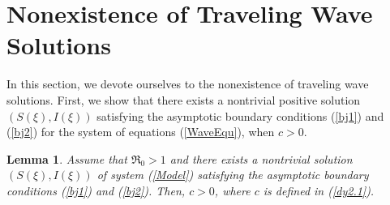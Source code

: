 \documentclass[final,3p,times]{elsarticle}
\newtheorem{lemma}{Lemma}[section]
\numberwithin{equation}{section}
\begin{document}
\section{Nonexistence of Traveling Wave Solutions}
In this section, we devote ourselves to the nonexistence of traveling wave solutions. First, we show that there exists a nontrivial positive solution \((S(\xi), I(\xi))\) satisfying the asymptotic boundary conditions  (\ref{bj1}) and  (\ref{bj2})  for the system of equations (\ref{WaveEqu}), when \(c > 0\).
\begin{lemma}\label{lemma5.1}
Assume that \(\Re_0>1\) and there exists a nontrivial solution \((S(\xi), I(\xi))\) of system (\ref{Model}) satisfying the asymptotic boundary conditions (\ref{bj1}) and  (\ref{bj2}). Then, \(c > 0\), where \(c\) is defined in (\ref{dy2.1}).
\end{lemma}
\end{document}
